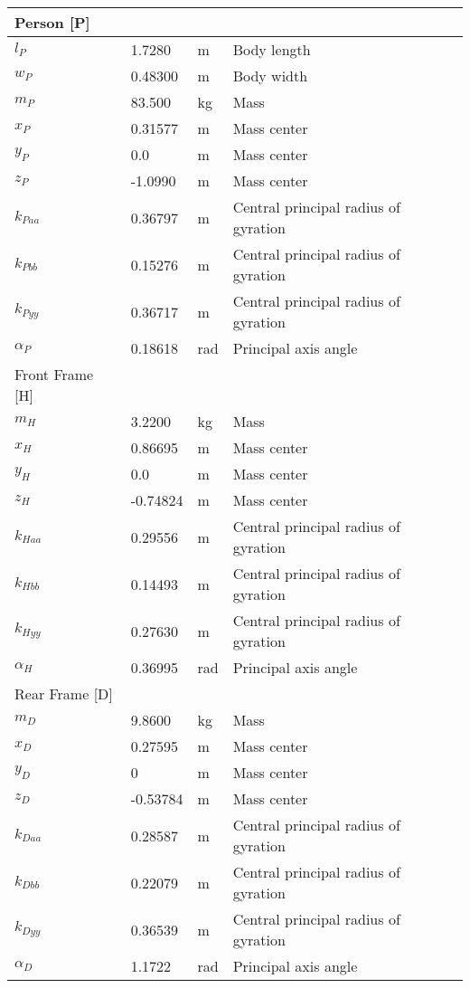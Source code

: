 \documentclass{bmd2019a}
\begin{document}
\begin{table}
\begin{tabular}{llll}
    Person [P] & & \\
    \midrule
    $l_P$ &  1.7280 & \si{\meter} & Body length \\
    $w_P$ &  0.48300 & \si{\meter} & Body width \\
    $m_P$ &  83.500 & \si{\kilogram} & Mass \\
    $x_P$ &  0.31577 & \si{\meter} & Mass center \\
    $y_P$ & 0.0 & \si{\meter} & Mass center \\
    $z_P$ & -1.0990 & \si{\meter} & Mass center \\
    $k_{Paa}$ &  0.36797 & \si{\meter} & Central principal radius of gyration \\
    $k_{Pbb}$ &  0.15276 & \si{\meter} & Central principal radius of gyration \\
    $k_{Pyy}$ &  0.36717 & \si{\meter} & Central principal radius of gyration \\
    $\alpha_P$ & 0.18618 & \si{\radian} & Principal axis angle \\
    Front Frame [H] & & \\
    \midrule
    $m_H$ & 3.2200 & \si{\kilogram} & Mass \\
    $x_H$ & 0.86695 & \si{\meter} & Mass center \\
    $y_H$ & 0.0 & \si{\meter} & Mass center \\
    $z_H$ & -0.74824 & \si{\meter} & Mass center \\
    $k_{Haa}$ & 0.29556 & \si{\meter} & Central principal radius of gyration \\
    $k_{Hbb}$ & 0.14493 & \si{\meter} & Central principal radius of gyration \\
    $k_{Hyy}$ & 0.27630 & \si{\meter} & Central principal radius of gyration \\
    $\alpha_H$ & 0.36995 & \si{\radian} & Principal axis angle \\
    Rear Frame [D] & & \\
    \midrule
    $m_D$ &  9.8600 & \si{\kilogram} & Mass \\
    $x_D$ &  0.27595 & \si{\meter} & Mass center \\
    $y_D$ & 0 & \si{\meter} & Mass center \\
    $z_D$ & -0.53784 & \si{\meter} & Mass center \\
    $k_{Daa}$ &  0.28587 & \si{\meter} & Central principal radius of gyration \\
    $k_{Dbb}$ &  0.22079 & \si{\meter} & Central principal radius of gyration \\
    $k_{Dyy}$ &  0.36539 & \si{\meter} & Central principal radius of gyration \\
    $\alpha_D$ &  1.1722 & \si{\radian} & Principal axis angle \\
    \bottomrule
  \end{tabular}
\end{table}
\end{document}
